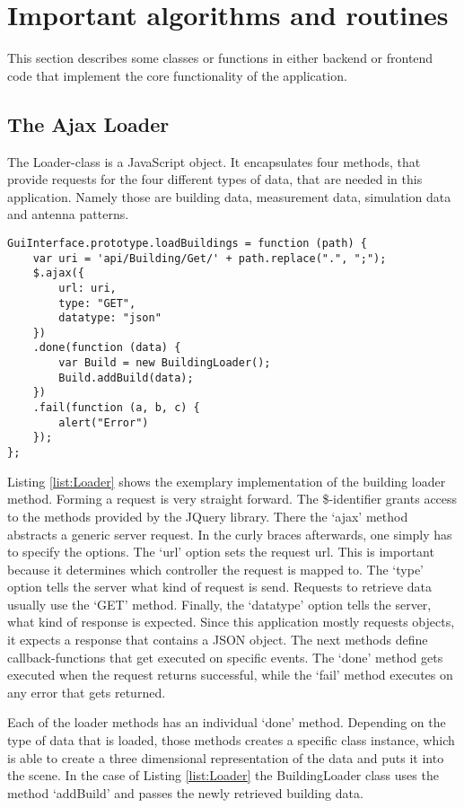 \section{Important algorithms and routines}
This section describes some classes or functions in either backend or frontend code that implement the core functionality of the application.
\subsection{The Ajax Loader}
The Loader-class is a JavaScript object. It encapsulates four methods, that provide requests for the four different types of data, that are needed in this application. Namely those are building data, measurement data, simulation data and antenna patterns.

\lstset{
caption=Building Loader,
label=list:Loader,
language=JavaScript}
\begin{lstlisting}[float=bph]
GuiInterface.prototype.loadBuildings = function (path) {
    var uri = 'api/Building/Get/' + path.replace(".", ";");
    $.ajax({
        url: uri,
        type: "GET",
        datatype: "json"
    })
    .done(function (data) {
        var Build = new BuildingLoader();
        Build.addBuild(data);
    })
    .fail(function (a, b, c) {
        alert("Error")
    });
};
\end{lstlisting}

Listing \ref{list:Loader} shows the exemplary implementation of the building loader method. Forming a request is very straight forward. The \$-identifier grants access to the methods provided by the JQuery library. There the `ajax' method abstracts a generic server request. In the curly braces afterwards, one simply has to specify the options. The `url' option sets the request url. This is important because it determines which controller the request is mapped to. The  `type' option tells the server what kind of request is send. Requests to retrieve data usually use the `GET' method. Finally, the `datatype' option tells the server, what kind of response is expected. Since this application mostly requests objects, it expects a response that contains a JSON object. The next methods define callback-functions that get executed on specific events. The `done' method gets executed when the request returns successful, while the `fail' method executes on any error that gets returned.

Each of the loader methods has an individual `done' method. Depending on the type of data that is loaded, those methods creates a specific class instance, which is able to create a three dimensional representation of the data and puts it into the scene. In the case of Listing \ref{list:Loader} the BuildingLoader class uses the method `addBuild' and passes the newly retrieved building data.


